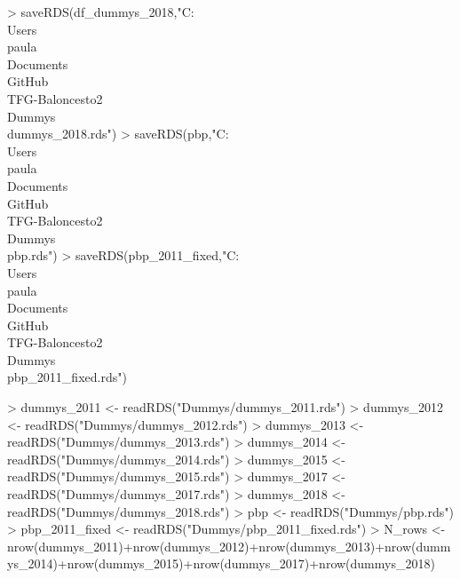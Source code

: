 \documentclass[paper=a4, fontsize=9pt]{article}
\begin{document}
\begin{Schunk}
\begin{Sinput}
> saveRDS(df_dummys_2018,"C:\\Users\\paula\\Documents\\GitHub\\TFG-Baloncesto2\\Dummys\\dummys_2018.rds")
> saveRDS(pbp,"C:\\Users\\paula\\Documents\\GitHub\\TFG-Baloncesto2\\Dummys\\pbp.rds")
> saveRDS(pbp_2011_fixed,"C:\\Users\\paula\\Documents\\GitHub\\TFG-Baloncesto2\\Dummys\\pbp_2011_fixed.rds")
\end{Sinput}
\end{Schunk}


\begin{Schunk}
\begin{Sinput}
> dummys_2011 <- readRDS("Dummys/dummys_2011.rds") 
> dummys_2012 <- readRDS("Dummys/dummys_2012.rds")
> dummys_2013 <- readRDS("Dummys/dummys_2013.rds")
> dummys_2014 <- readRDS("Dummys/dummys_2014.rds")
> dummys_2015 <- readRDS("Dummys/dummys_2015.rds")
> dummys_2017 <- readRDS("Dummys/dummys_2017.rds")
> dummys_2018 <- readRDS("Dummys/dummys_2018.rds")
> pbp <- readRDS("Dummys/pbp.rds")
> pbp_2011_fixed <- readRDS("Dummys/pbp_2011_fixed.rds")
> N_rows <- nrow(dummys_2011)+nrow(dummys_2012)+nrow(dummys_2013)+nrow(dummys_2014)+nrow(dummys_2015)+nrow(dummys_2017)+nrow(dummys_2018)
\end{Sinput}
\end{Schunk}

\begin{Schunk}
\end{Schunk}
\end{document}
